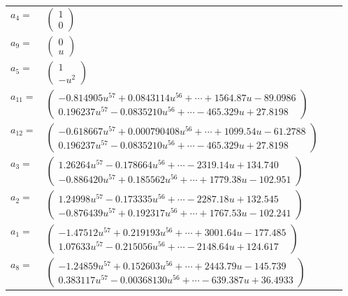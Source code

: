 \documentclass[1p]{elsarticle_modified}
\theoremstyle{definition}
\begin{document}
\begin{tabular}{m{7pt} m{180pt} m{7pt} m{180pt} }
\flushright $a_{4}=$&$\begin{pmatrix}1\\0\end{pmatrix}$ \\
\flushright $a_{9}=$&$\begin{pmatrix}0\\u\end{pmatrix}$ \\
\flushright $a_{5}=$&$\begin{pmatrix}1\\- u^2\end{pmatrix}$ \\
\flushright $a_{11}=$&$\begin{pmatrix}-0.814905 u^{57}+0.0843114 u^{56}+\cdots+1564.87 u-89.0986\\0.196237 u^{57}-0.0835210 u^{56}+\cdots-465.329 u+27.8198\end{pmatrix}$ \\
\flushright $a_{12}=$&$\begin{pmatrix}-0.618667 u^{57}+0.000790408 u^{56}+\cdots+1099.54 u-61.2788\\0.196237 u^{57}-0.0835210 u^{56}+\cdots-465.329 u+27.8198\end{pmatrix}$ \\
\flushright $a_{3}=$&$\begin{pmatrix}1.26264 u^{57}-0.178664 u^{56}+\cdots-2319.14 u+134.740\\-0.886420 u^{57}+0.185562 u^{56}+\cdots+1779.38 u-102.951\end{pmatrix}$ \\
\flushright $a_{2}=$&$\begin{pmatrix}1.24998 u^{57}-0.173335 u^{56}+\cdots-2287.18 u+132.545\\-0.876439 u^{57}+0.192317 u^{56}+\cdots+1767.53 u-102.241\end{pmatrix}$ \\
\flushright $a_{1}=$&$\begin{pmatrix}-1.47512 u^{57}+0.219193 u^{56}+\cdots+3001.64 u-177.485\\1.07633 u^{57}-0.215056 u^{56}+\cdots-2148.64 u+124.617\end{pmatrix}$ \\
\flushright $a_{8}=$&$\begin{pmatrix}-1.24859 u^{57}+0.152603 u^{56}+\cdots+2443.79 u-145.739\\0.383117 u^{57}-0.00368130 u^{56}+\cdots-639.387 u+36.4933\end{pmatrix}$ \\

\end{tabular}
\end{document}

